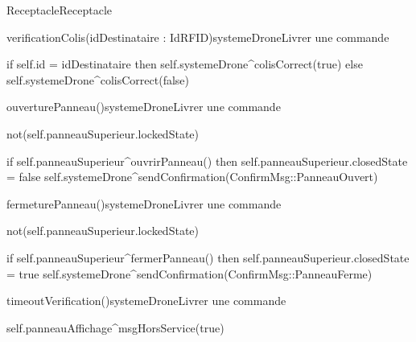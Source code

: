 \begin{OM}{Receptacle}{Receptacle}
    \begin{OMOperation}{verificationColis(idDestinataire : IdRFID)}{systemeDrone}{Livrer une commande}
        \begin{OMMessages}
        \end{OMMessages}
        \OMNoPre
        \begin{OMPost}
if self.id = idDestinataire then
    self.systemeDrone^colisCorrect(true)
else
    self.systemeDrone^colisCorrect(false)
        \end{OMPost}
    \end{OMOperation}

    \begin{OMOperation}{ouverturePanneau()}{systemeDrone}{Livrer une commande}
        \begin{OMMessages}
        \end{OMMessages}
        \begin{OMPre}
not(self.panneauSuperieur.lockedState)
        \end{OMPre}
        \begin{OMPost}
if self.panneauSuperieur^ouvrirPanneau() then
    self.panneauSuperieur.closedState = false
    self.systemeDrone^sendConfirmation(ConfirmMsg::PanneauOuvert)
        \end{OMPost}
    \end{OMOperation}

    \begin{OMOperation}{fermeturePanneau()}{systemeDrone}{Livrer une commande}
        \begin{OMMessages}
        \end{OMMessages}
        \begin{OMPre}
not(self.panneauSuperieur.lockedState)
        \end{OMPre}
        \begin{OMPost}
if self.panneauSuperieur^fermerPanneau() then
    self.panneauSuperieur.closedState = true
    self.systemeDrone^sendConfirmation(ConfirmMsg::PanneauFerme)
        \end{OMPost}
    \end{OMOperation}

    \begin{OMOperation}{timeoutVerification()}{systemeDrone}{Livrer une commande}
        \begin{OMMessages}
        \end{OMMessages}
        \OMNoPre
        \begin{OMPost}
self.panneauAffichage^msgHorsService(true)
        \end{OMPost}
    \end{OMOperation}


\end{OM}
